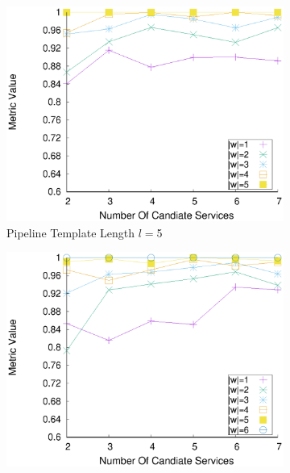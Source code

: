 \begin{figure}[ht!]
\begin{subfigure}{0.49\textwidth}
        \label{fig:quality_window_average_perce_n4}
      \end{subfigure}
      \hfill
      \begin{subfigure}{0.49\textwidth}
        \includegraphics[width=\textwidth]{Images/graphs/window_quality_performance_diff_perce_n7_s7_50_89_n5}
        \caption{Pipeline Template Length $l$$=$5}
        \label{fig:quality_window_average_perce_n5}
      \end{subfigure}
      \hfill
      \begin{subfigure}{0.49\textwidth}
        \includegraphics[width=\textwidth]{Images/graphs/window_quality_performance_diff_perce_n7_s7_50_89_n6}

\end{subfigure}
\end{figure}
